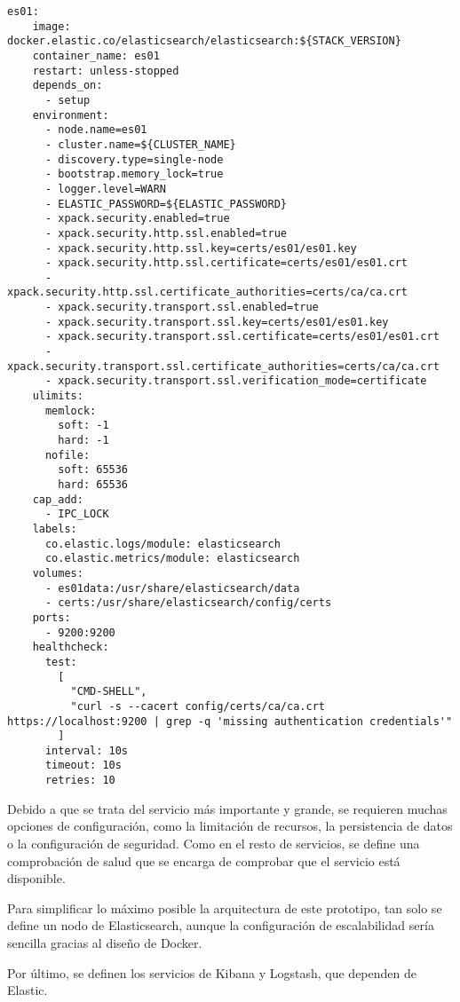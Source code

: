 \begin{lstlisting}[style=yaml, caption={Definición del servicio de Elasticsearch}]
es01:
    image: docker.elastic.co/elasticsearch/elasticsearch:${STACK_VERSION}
    container_name: es01
    restart: unless-stopped
    depends_on:
      - setup
    environment:
      - node.name=es01
      - cluster.name=${CLUSTER_NAME}
      - discovery.type=single-node
      - bootstrap.memory_lock=true
      - logger.level=WARN
      - ELASTIC_PASSWORD=${ELASTIC_PASSWORD}
      - xpack.security.enabled=true
      - xpack.security.http.ssl.enabled=true
      - xpack.security.http.ssl.key=certs/es01/es01.key
      - xpack.security.http.ssl.certificate=certs/es01/es01.crt
      - xpack.security.http.ssl.certificate_authorities=certs/ca/ca.crt
      - xpack.security.transport.ssl.enabled=true
      - xpack.security.transport.ssl.key=certs/es01/es01.key
      - xpack.security.transport.ssl.certificate=certs/es01/es01.crt
      - xpack.security.transport.ssl.certificate_authorities=certs/ca/ca.crt
      - xpack.security.transport.ssl.verification_mode=certificate
    ulimits:
      memlock:
        soft: -1
        hard: -1
      nofile:
        soft: 65536
        hard: 65536
    cap_add:
      - IPC_LOCK
    labels:
      co.elastic.logs/module: elasticsearch
      co.elastic.metrics/module: elasticsearch
    volumes:
      - es01data:/usr/share/elasticsearch/data
      - certs:/usr/share/elasticsearch/config/certs
    ports:
      - 9200:9200
    healthcheck:
      test:
        [
          "CMD-SHELL",
          "curl -s --cacert config/certs/ca/ca.crt https://localhost:9200 | grep -q 'missing authentication credentials'"
        ]
      interval: 10s
      timeout: 10s
      retries: 10
\end{lstlisting}

Debido a que se trata del servicio más importante y grande, se requieren muchas
opciones de configuración, como la limitación de recursos, la persistencia de
datos o la configuración de seguridad. Como en el resto de servicios, se define
una comprobación de salud que se encarga de comprobar que el servicio está
disponible.

Para simplificar lo máximo posible la arquitectura de este prototipo, tan solo
se define un nodo de Elasticsearch, aunque la configuración de escalabilidad
sería sencilla gracias al diseño de Docker.

\newpage{}
Por último, se definen los servicios de Kibana y Logstash, que dependen de
Elastic.

